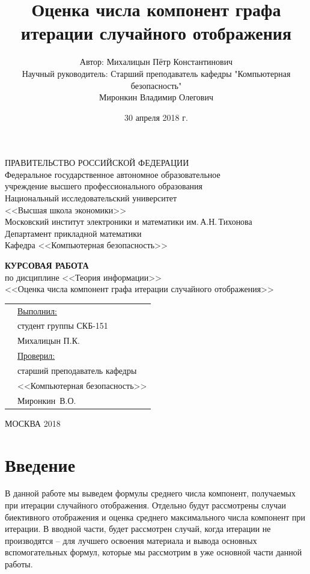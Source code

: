\documentclass[10pt, a4paper]{report}
\title{Оценка числа компонент графа итерации случайного отображения}
\author{Автор: Михалицын Пётр Константинович \\ Научный руководитель: Старший преподаватель кафедры "Компьютерная безопасность" \\ Миронкин Владимир Олегович}
\date{30 апреля 2018 г.}
\theoremstyle{definition}
\begin{document}
\thispagestyle{empty}
\large
\begin{singlespacing}
	\begin{center}
		
		ПРАВИТЕЛЬСТВО РОССИЙСКОЙ ФЕДЕРАЦИИ\\
		\vspace{0.5cm}
		Федеральное государственное автономное образовательное\\
		учреждение высшего профессионального образования\\
		Национальный исследовательский университет\\
		<<Высшая школа экономики>>\\
		\vspace{0.5cm}
		Московский институт электроники и математики им.\,А.Н.\,Тихонова \\
		Департамент прикладной математики\\
		Кафедра <<Компьютерная безопасность>>
		
		\vspace{2.5cm}
		
		
		{\bf КУРСОВАЯ РАБОТА}\\
		по дисциплине <<Теория информации>>\\[2ex]
		<<Оценка числа компонент графа итерации случайного отображения>>
		
		
		\vspace{5cm}
		
		
		\begin{tabular}{ll}
			\hspace{9cm} & \underline{Выполнил:}\\
			& студент группы СКБ-151\\
			& Михалицын П.К.\\
			& \underline{Проверил:}\\
			&  старший преподаватель кафедры\\
			& <<Компьютерная безопасность>>\\
			&  Миронкин~В.О.
		\end{tabular}
		
	\end{center}
	\vfill
	\begin{center}
		МОСКВА 2018
	\end{center}
\end{singlespacing}
\normalsize

\tableofcontents

\chapter*{Введение}
В данной работе мы выведем формулы среднего числа компонент, получаемых при итерации случайного отображения. Отдельно будут рассмотрены случаи биективного отображения и оценка среднего максимального числа компонент при итерации. В вводной части, будет рассмотрен случай, когда итерации не производятся -- для лучшего освоения материала и вывода основных вспомогательных формул, которые мы рассмотрим в уже основной части данной работы. 
\end{document}
